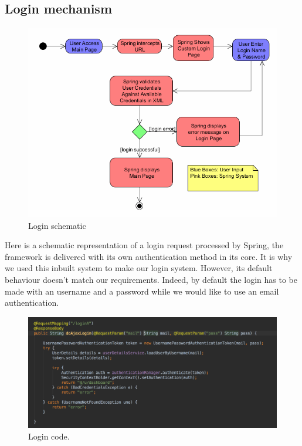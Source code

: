 \subsection{Login mechanism}

\begin{figure}[H]
  \caption{Login schematic}
  \centering
    \includegraphics[width=1\textwidth]{img/login.png}
\end{figure}


Here is a schematic representation of a login request processed by Spring, the framework is delivered with its own authentication method in its core. It is why we used this inbuilt system to make our login system. However, its default behaviour doesn't match our requirements. Indeed, by default the login has to be made with an username and a password while we would like to use an email authentication. 

\begin{figure}[H]
  \caption{Login code.}
  \centering
    \includegraphics[width=1\textwidth]{img/loginCode.png}
\end{figure}

